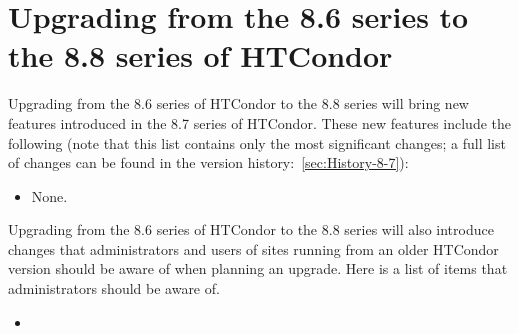 \section{Upgrading from the 8.6 series to the 8.8 series of HTCondor}\label{sec:to-8.8}

Upgrading from the 8.6 series of HTCondor to the 8.8 series
will bring new features introduced in the 8.7 series of HTCondor.
These new features include the following (note that this list contains
only the most significant changes; a full list of changes can be
found in the version history:~\ref{sec:History-8-7}):

\begin{itemize}

\item None.

\end{itemize}

Upgrading from the 8.6 series of HTCondor to the 8.8 series will
also introduce changes that administrators and users of sites running
from an older HTCondor version should be aware of when planning an upgrade.
Here is a list of items that administrators should be aware of.

\begin{itemize}

\item

\end{itemize}


